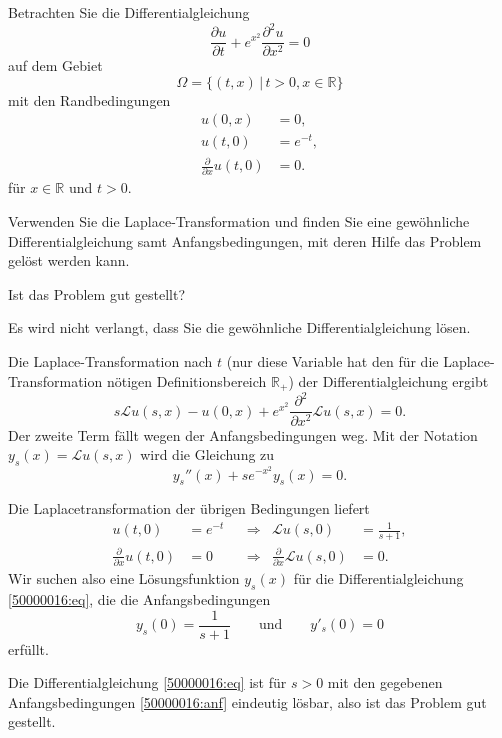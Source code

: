 Betrachten Sie die Differentialgleichung
\begin{equation}
\frac{\partial u}{\partial t}
+
e^{x^2}
\frac{\partial^2 u}{\partial x^2}
=
0
\end{equation}
auf dem Gebiet
\[
\Omega = \{ (t,x)\,|\, t>0, x\in\mathbb R\}
\]
mit den Randbedingungen
\begin{align*}
u(0,x) &= 0,\\
u(t,0) &= e^{-t},\\
\frac{\partial}{\partial x}u(t,0) &=0.
\end{align*}
für $x\in\mathbb R$ und $t > 0$.
\begin{teilaufgaben}
\item
Verwenden Sie die Laplace-Transformation und finden Sie eine gewöhnliche
Differentialgleichung samt Anfangsbedingungen, mit deren Hilfe das
Problem gelöst werden kann.
\item
Ist das Problem gut gestellt?
\end{teilaufgaben}

\begin{hinweis}
Es wird nicht verlangt, dass Sie die gewöhnliche Differentialgleichung lösen.
\end{hinweis}

\begin{loesung}
\begin{teilaufgaben}
\item
Die Laplace-Transformation nach $t$ (nur diese Variable hat den für die
Laplace-Transformation nötigen Definitionsbereich $\mathbb R_+$)
der Differentialgleichung ergibt
\[
s\mathcal{L}u(s,x) - u(0,x)
+ e^{x^2}\frac{\partial^2}{\partial x^2}\mathcal{L}u(s,x)
= 0.
\]
Der zweite Term fällt wegen der Anfangsbedingungen weg.
Mit der Notation $y_s(x) = \mathcal{L}u(s,x)$ wird die Gleichung zu
\begin{equation}
y_s''(x)+se^{-x^2}y_s(x)=0.
\label{50000016:eq}
\end{equation}

Die Laplacetransformation der übrigen Bedingungen liefert
\[
\begin{aligned}
u(t,0)&=e^{-t}
&&\Rightarrow&
\mathcal{L} u(s,0)&=\frac1{s+1},
\\
\frac{\partial}{\partial x}u(t,0)&=0
&&\Rightarrow&
\frac{\partial}{\partial x}\mathcal{L}u(s,0)&= 0.
\end{aligned}
\]
Wir suchen also eine Lösungsfunktion $y_s(x)$ für die Differentialgleichung
\eqref{50000016:eq}, die die Anfangsbedingungen
\begin{equation}
y_s(0)=\frac1{s+1}
\qquad\text{und}\qquad
y'_s(0)=0
\label{50000016:anf}
\end{equation}
erfüllt.
\item
Die Differentialgleichung \eqref{50000016:eq} ist für $s>0$ mit den gegebenen
Anfangsbedingungen \eqref{50000016:anf} eindeutig lösbar, also ist
das Problem gut gestellt.
\qedhere
\end{teilaufgaben}
\end{loesung}

